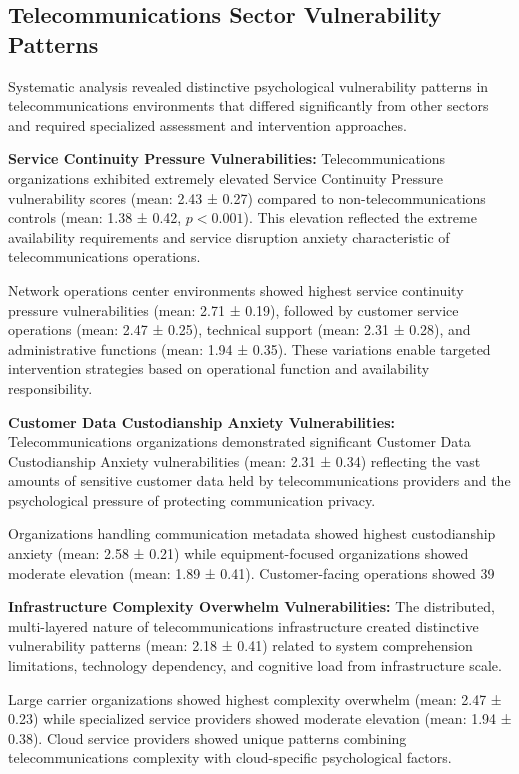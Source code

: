 \documentclass[10pt, twocolumn]{article}
\begin{document}
\subsection{Telecommunications Sector Vulnerability Patterns}

Systematic analysis revealed distinctive psychological vulnerability patterns in telecommunications environments that differed significantly from other sectors and required specialized assessment and intervention approaches.

\textbf{Service Continuity Pressure Vulnerabilities:} Telecommunications organizations exhibited extremely elevated Service Continuity Pressure vulnerability scores (mean: 2.43 ± 0.27) compared to non-telecommunications controls (mean: 1.38 ± 0.42, $p < 0.001$). This elevation reflected the extreme availability requirements and service disruption anxiety characteristic of telecommunications operations.

Network operations center environments showed highest service continuity pressure vulnerabilities (mean: 2.71 ± 0.19), followed by customer service operations (mean: 2.47 ± 0.25), technical support (mean: 2.31 ± 0.28), and administrative functions (mean: 1.94 ± 0.35). These variations enable targeted intervention strategies based on operational function and availability responsibility.

\textbf{Customer Data Custodianship Anxiety Vulnerabilities:} Telecommunications organizations demonstrated significant Customer Data Custodianship Anxiety vulnerabilities (mean: 2.31 ± 0.34) reflecting the vast amounts of sensitive customer data held by telecommunications providers and the psychological pressure of protecting communication privacy.

Organizations handling communication metadata showed highest custodianship anxiety (mean: 2.58 ± 0.21) while equipment-focused organizations showed moderate elevation (mean: 1.89 ± 0.41). Customer-facing operations showed 39%

\textbf{Infrastructure Complexity Overwhelm Vulnerabilities:} The distributed, multi-layered nature of telecommunications infrastructure created distinctive vulnerability patterns (mean: 2.18 ± 0.41) related to system comprehension limitations, technology dependency, and cognitive load from infrastructure scale.

Large carrier organizations showed highest complexity overwhelm (mean: 2.47 ± 0.23) while specialized service providers showed moderate elevation (mean: 1.94 ± 0.38). Cloud service providers showed unique patterns combining telecommunications complexity with cloud-specific psychological factors.
\end{document}
